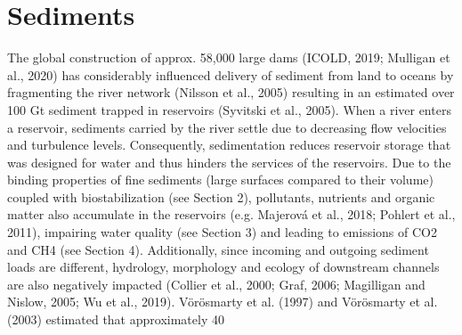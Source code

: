 \section{Sediments}
\label{sec:1}
The global construction of approx. 58,000 large dams (ICOLD, 2019; Mulligan et al., 2020) has considerably influenced delivery of sediment from land to oceans by fragmenting the river network (Nilsson et al., 2005) resulting in an estimated over 100 Gt sediment trapped in reservoirs (Syvitski et al., 2005). When a river enters a reservoir, sediments carried by the river settle due to decreasing flow velocities and turbulence levels. Consequently, sedimentation reduces reservoir storage that was designed for water and thus hinders the services of the reservoirs. Due to the binding properties of fine sediments (large surfaces compared to their volume) coupled with biostabilization (see Section 2), pollutants, nutrients and organic matter also accumulate in the reservoirs (e.g. Majerová et al., 2018; Pohlert et al., 2011), impairing water quality (see Section 3) and leading to emissions of CO2 and CH4 (see Section 4). Additionally, since incoming and outgoing sediment loads are different, hydrology, morphology and ecology of downstream channels are also negatively impacted (Collier et al., 2000; Graf, 2006; Magilligan and Nislow, 2005; Wu et al., 2019). Vörösmarty et al. (1997) and Vörösmarty et al. (2003) estimated that approximately 40%
